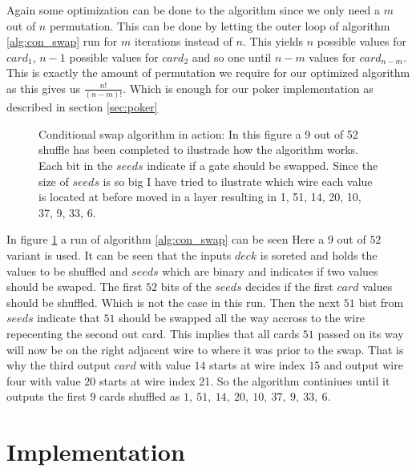 \documentclass[twoside,11pt,openright]{report}
\begin{document}
\bigskip

Again some optimization can be done to the algorithm since we only need a $m$ out of $n$ permutation. This can be done by letting the outer loop of algorithm \ref{alg:con_swap} run for $m$ iterations instead of $n$. This yields $n$ possible values for $card_1$, $n-1$ possible values for $card_2$ and so one until $n-m$ values for $card_{n-m}$. This is exactly the amount of permutation we require for our optimized algorithm as this gives us $\frac{n!}{(n-m)!}$. Which is enough for our poker implementation as described in section \ref{sec:poker}

\bigskip

\begin{figure}
\centering
\scalebox{1.5}{}
\caption{Conditional swap algorithm in action: In this figure a 9 out of 52 shuffle has been completed to ilustrade how the algorithm works. Each bit in the $seeds$ indicate if a gate should be swapped. Since the size of $seeds$ is so big I have tried to ilustrate which wire each value is located at before moved in a layer resulting in 1, 51, 14, 20, 10, 37, 9, 33, 6.}
\label{fig:con_swap}
\end{figure}

In figure \ref{fig:con_swap} a run of algorithm \ref{alg:con_swap} can be seen Here a $9$ out of $52$ variant is used. It can be seen that the inputs $deck$ is soreted and holds the values to be shuffled and $seeds$ which are binary and indicates if two values should be swaped. The first $52$ bits of the $seeds$ decides if the first $card$ values should be shuffled. Which is not the case in this run. Then the next $51$ bist from $seeds$ indicate that $51$ should be swapped all the way accross to the wire repecenting the second out card. This implies that all cards $51$ passed on its way will now be on the right adjacent wire to where it was prior to the swap. That is why the third output $card$ with value $14$ starts at wire index $15$ and output wire four with value $20$ starts at wire index 21. So the algorithm continiues until it outputs the first $9$ cards shuffled as $1,~51,~14,~20,~10,~37,~9,~33,~6$.


\section{Implementation}
\label{sec:cir_imp}
\end{document}
